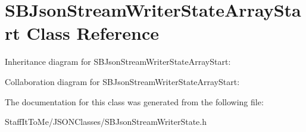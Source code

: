 \hypertarget{interface_s_b_json_stream_writer_state_array_start}{
\section{\-S\-B\-Json\-Stream\-Writer\-State\-Array\-Start \-Class \-Reference}
\label{interface_s_b_json_stream_writer_state_array_start}
}


\-Inheritance diagram for \-S\-B\-Json\-Stream\-Writer\-State\-Array\-Start\-:


\-Collaboration diagram for \-S\-B\-Json\-Stream\-Writer\-State\-Array\-Start\-:


\-The documentation for this class was generated from the following file\-:\begin{DoxyCompactItemize}
\item 
\-Staff\-It\-To\-Me/\-J\-S\-O\-N\-Classes/\-S\-B\-Json\-Stream\-Writer\-State.\-h\end{DoxyCompactItemize}
